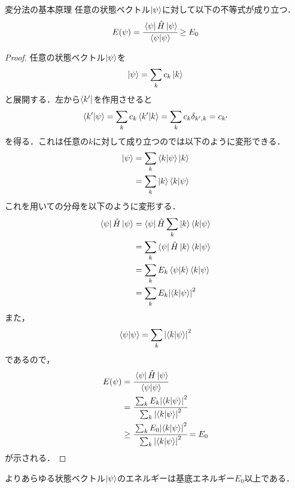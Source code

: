 \documentclass{standalone}
\begin{document}
  \begin{myprop}{変分法の基本原理}{}
    任意の状態ベクトル$\ket{\psi}$に対して以下の不等式が成り立つ．
    \begin{align}
      E(\psi) = \cfrac{\bra{\psi}\hat{H}\ket{\psi}}{\bra{\psi}\ket{\psi}} \ge E_0 \label{ne}
    \end{align}
    \tcblower
    \begin{proof}
      任意の状態ベクトル$\ket{\psi}$を
      \begin{align}
        \ket{\psi} = \sum_{k} c_k\ket{k} \label{sv}
      \end{align}
      と展開する．左から$\bra{k'}$を作用させると
      \begin{align}
        \bra{k'}\ket{\psi} = \sum_{k}c_k\bra{k'}\ket{k} = \sum_{k}c_k\delta_{k',k} = c_{k'}
      \end{align}
      を得る．これは任意の$k$に対して成り立つのでは以下のように変形できる．
      \begin{align}
        \ket{\psi}&=\sum_{k}\bra{k}\ket{\psi}\ket{k}\\
        &=\sum_{k}\ket{k}\bra{k}\ket{\psi}
      \end{align}
      これを用いての分母を以下のように変形する．
      \begin{align}
        \bra{\psi}\hat{H}\ket{\psi}&=\bra{\psi}\hat{H}\sum_{k}\ket{k}\bra{k}\ket{\psi}\\
        &=\sum_{k}\bra{\psi}\hat{H}\ket{k}\bra{k}\ket{\psi}\\
        &=\sum_{k}E_k\bra{\psi}\ket{k}\bra{k}\ket{\psi}\\
        &=\sum_{k}E_k \abs{\bra{k}\ket{\psi}}^2
      \end{align}
      また，
      \begin{align}
        \braket{\psi}{\psi}=\sum_{k}\abs{\braket{k}{\psi}}^2
      \end{align}
      であるので，
      \begin{align}
        E(\psi) &= \cfrac{\bra{\psi}\hat{H}\ket{\psi}}{\braket{\psi}{\psi} } \\ 
        &= \cfrac{\sum_{k}E_k\abs{\braket{k}{\psi}}^2}{\sum_{k}\abs{\braket{k}{\psi}}^2} \\ 
        &\geq \cfrac{\sum_{k}E_0\abs{\braket{k}{\psi}}^2}{\sum_{k}\abs{\braket{k}{\psi}}^2} = E_0
      \end{align}
      が示される．
    \end{proof}
  \end{myprop}
  よりあらゆる状態ベクトル$\ket{\psi}$のエネルギーは基底エネルギー$E_0$以上である．
\end{document}
